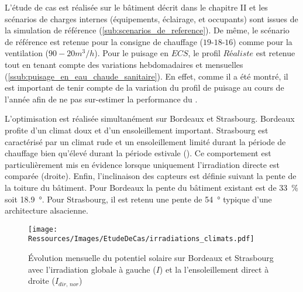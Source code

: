 L’étude de cas est réalisée sur le bâtiment décrit dans le chapitre II et les scénarios de
charges internes (équipements, éclairage, et occupants) sont issues de la simulation de
référence (\ref{sub:scenarios_de_reference}). De même, le scénario de référence est
retenue pour la consigne de chauffage ($19$-$18$-$16$) comme pour la ventilation
($90-20 \si{m^{3}\per h}$). Pour le puisage en $ECS$, le profil $Réaliste$ est retenue tout en tenant
compte des variations hebdomadaires et mensuelles
(\ref{ssub:puisage_en_eau_chaude_sanitaire}). En effet, comme il a été montré, il est
important de tenir compte de la variation du profil de puisage au cours de l’année afin de
ne pas sur-estimer la performance du .

L’optimisation est réalisée simultanément sur Bordeaux et Strasbourg. Bordeaux profite
d’un climat doux et d’un ensoleillement important. Strasbourg est caractérisé par un
climat rude et un ensoleillement limité durant la période de chauffage bien qu’élevé
durant la période estivale (). Ce comportement
est particulièrement mis en évidence lorsque uniquement l’irradiation directe est comparée
(droite). Enfin, l’inclinaison des capteurs est définie suivant la pente de la toiture du
bâtiment. Pour Bordeaux la pente du bâtiment existant est de \SI{33}{\percent} soit
\SI{18.9}{\degree}. Pour Strasbourg, il est retenu une pente de \SI{54}{\degree} typique
d’une architecture alsacienne.

\begin{figure}
    \centering
    \texttt{[image: Ressources/Images/EtudeDeCas/irradiations\_climats.pdf]}
    \caption[Évolution mensuelle du potentiel solaire sur Bordeaux et Strasbourg]
            {Évolution mensuelle du potentiel solaire sur Bordeaux et Strasbourg avec l’irradiation
            globale à gauche ($I$) et la l’ensoleillement direct à droite ($I_{dir,\,nor}$)}
    \label{fig:diff_ensoleillement_bor_stras}
\end{figure}



